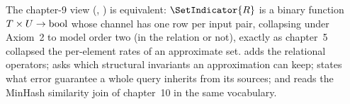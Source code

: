The chapter-9 view (, )
is equivalent: $\SetIndicator{R}$ is a binary function $T \times U \to \mathrm{bool}$
whose channel has one row per input pair, collapsing under Axiom~2 to model order
two (in the relation or not), exactly as chapter~5 collapsed the per-element
rates of an approximate set.  adds the relational
operators;  asks which structural invariants an
approximation can keep;  states what error guarantee a
whole query inherits from its sources; and  reads the
MinHash similarity join of chapter~10 in the same vocabulary.
